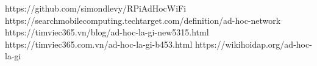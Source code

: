\documentclass[12pt,a4paper]{report}
\begin{document}
\begin{thebibliography}{99}               %

 https://github.com/simondlevy/RPiAdHocWiFi
 https://searchmobilecomputing.techtarget.com/definition/ad-hoc-network
 https://timviec365.vn/blog/ad-hoc-la-gi-new5315.html
 https://timviec365.com.vn/ad-hoc-la-gi-b453.html
 https://wikihoidap.org/ad-hoc-la-gi

\end{thebibliography}
\end{document}
